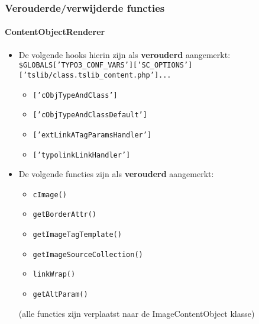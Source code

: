 \begin{frame}[fragile]
	\frametitle{Verouderde/verwijderde functies}
	\framesubtitle{ContentObjectRenderer}

	\begin{itemize}
		\item De volgende hooks hierin zijn als \textbf{verouderd} aangemerkt:\newline
			\tiny
				\texttt{\$GLOBALS['TYPO3\_CONF\_VARS']['SC\_OPTIONS']['tslib/class.tslib\_content.php']...}
			\normalsize

			\begin{itemize}\smaller
				\item \texttt{['cObjTypeAndClass']}
				\item \texttt{['cObjTypeAndClassDefault']}
				\item \texttt{['extLinkATagParamsHandler']}
				\item \texttt{['typolinkLinkHandler']}
			\end{itemize}

		\item De volgende functies zijn als \textbf{verouderd} aangemerkt:

			\begin{itemize}\smaller
				\item \texttt{cImage()}
				\item \texttt{getBorderAttr()}
				\item \texttt{getImageTagTemplate()}
				\item \texttt{getImageSourceCollection()}
				\item \texttt{linkWrap()}
				\item \texttt{getAltParam()}
			\end{itemize}

			\smaller
				(alle functies zijn verplaatst naar de ImageContentObject klasse)
			\normalsize

	\end{itemize}

\end{frame}


